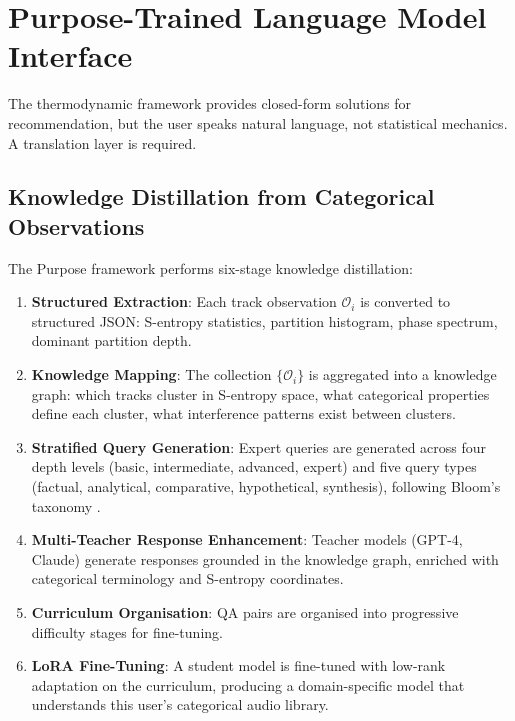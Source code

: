 \documentclass[11pt,twocolumn,a4paper]{article}
\begin{document}
\section{Purpose-Trained Language Model Interface}
\label{sec:purpose}

The thermodynamic framework provides closed-form solutions for
recommendation, but the user speaks natural language, not statistical
mechanics. A translation layer is required.

\subsection{Knowledge Distillation from Categorical Observations}

The Purpose framework performs six-stage knowledge distillation:

\begin{enumerate}[leftmargin=*,itemsep=2pt]
\item \textbf{Structured Extraction}: Each track observation
  $\mathcal{O}_i$ is converted to structured JSON: S-entropy
  statistics, partition histogram, phase spectrum, dominant partition
  depth.

\item \textbf{Knowledge Mapping}: The collection $\{\mathcal{O}_i\}$
  is aggregated into a knowledge graph: which tracks cluster in
  S-entropy space, what categorical properties define each cluster,
  what interference patterns exist between clusters.

\item \textbf{Stratified Query Generation}: Expert queries are
  generated across four depth levels (basic, intermediate, advanced,
  expert) and five query types (factual, analytical, comparative,
  hypothetical, synthesis), following Bloom's taxonomy
  \citep{bloom1956taxonomy}.

\item \textbf{Multi-Teacher Response Enhancement}: Teacher models
  (GPT-4, Claude) generate responses grounded in the knowledge graph,
  enriched with categorical terminology and S-entropy coordinates.

\item \textbf{Curriculum Organisation}: QA pairs are organised into
  progressive difficulty stages for fine-tuning.

\item \textbf{LoRA Fine-Tuning}: A student model is fine-tuned with
  low-rank adaptation \citep{hu2021lora} on the curriculum, producing
  a domain-specific model that understands this user's categorical
  audio library.
\end{enumerate}
\end{document}
